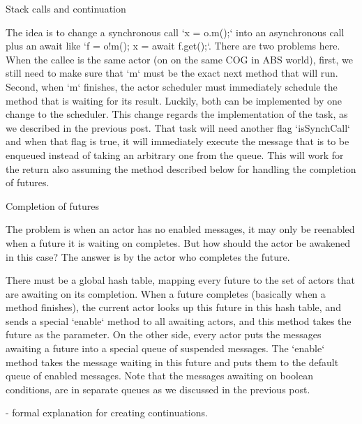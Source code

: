 Stack calls and continuation

The idea is to change a synchronous call `x = o.m();` into an asynchronous call plus an await like `f = o!m(); x = await f.get();`. There are two problems here. When the callee is the same actor (on on the same COG in ABS world), first, we still need to make sure that `m` must be the exact next method that will run. Second, when `m` finishes, the actor scheduler must immediately schedule the method that is waiting for its result. Luckily, both can be implemented by one change to the scheduler. This change regards the implementation of the task, as we described in the previous post. That task will need another flag `isSynchCall` and when that flag is true, it will immediately execute the message that is to be enqueued instead of taking an arbitrary one from the queue. This will work for the return also assuming the method described below for handling the completion of futures.

Completion of futures

The problem is when an actor has no enabled messages, it may only be reenabled when a future it is waiting on completes. But how should the actor be awakened in this case? The answer is by the actor who completes the future.

There must be a global hash table, mapping every future to the set of actors that are awaiting on its completion. When a future completes (basically when a method finishes), the current actor looks up this future in this hash table, and sends a special `enable` method to all awaiting actors, and this method takes the future as the parameter. On the other side, every actor puts the messages awaiting a future into a special queue of suspended messages. The `enable` method takes the message waiting in this future and puts them to the default queue of enabled messages. Note that the messages awaiting on boolean conditions, are in separate queues as we discussed in the previous post.



- formal explanation for creating continuations.